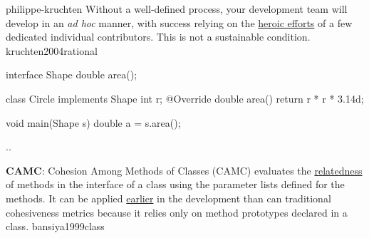 \documentclass{article}
\begin{document}

\lnQuote
  {philippe-kruchten}
  {Without a well-defined process, your development team will develop in an \textit{ad hoc} manner, with success relying on the \ul{heroic efforts} of a few dedicated individual contributors. This is not a sustainable condition.}
  {kruchten2004rational}


\begin{pptWide}{2}
{\small\begin{ffcode}
interface Shape
  double area();

class Circle implements Shape
  int r;
  @Override
  double area()
    return r * r * 3.14d;

void main(Shape s)
  double a = s.area();
\end{ffcode}
}
\par\columnbreak\par
{}
\par
..
\end{pptWide}
\plush{}

  {\textbf{CAMC}: Cohesion Among Methods of Classes (CAMC) evaluates the \ul{relatedness} of methods in the interface of a class using the parameter lists defined for the methods. It can be applied \ul{earlier} in the development than can traditional cohesiveness metrics because it relies only on method prototypes declared in a class.}
  {bansiya1999class}
\end{document}
